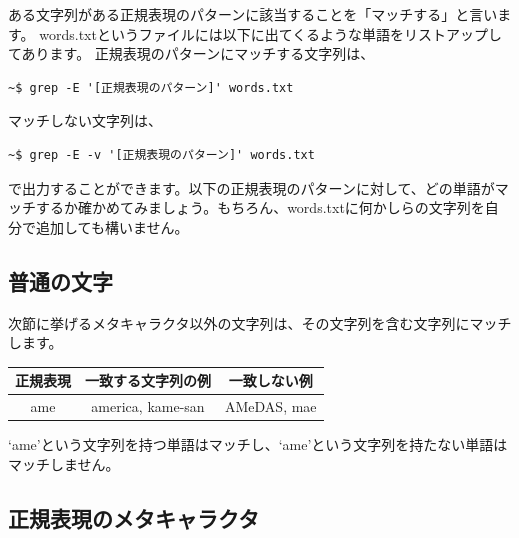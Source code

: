 \documentclass[a4j]{ltjsreport}
\begin{document}
    ある文字列がある正規表現のパターンに該当することを「マッチする」と言います。
    words.txtというファイルには以下に出てくるような単語をリストアップしてあります。
    正規表現のパターンにマッチする文字列は、
    \begin{lstlisting}[numbers=none]
        ~$ grep -E '[正規表現のパターン]' words.txt
    \end{lstlisting}
    マッチしない文字列は、
    \begin{lstlisting}[numbers=none]
        ~$ grep -E -v '[正規表現のパターン]' words.txt
    \end{lstlisting}
    で出力することができます。以下の正規表現のパターンに対して、どの単語がマッチするか確かめてみましょう。もちろん、words.txtに何かしらの文字列を自分で追加しても構いません。

    \subsection{普通の文字}
    次節に挙げるメタキャラクタ以外の文字列は、その文字列を含む文字列にマッチします。

    \begin{table}[h]
        \centering
        \begin{tabular}{|c|c|c|}
            \hline
            正規表現 & 一致する文字列の例 & 一致しない例 \\
            \hline\hline
            ame & america, kame-san & AMeDAS, mae \\
            \hline
        \end{tabular}
    \end{table}
    `ame'という文字列を持つ単語はマッチし、`ame'という文字列を持たない単語はマッチしません。

    \subsection{正規表現のメタキャラクタ}
\end{document}
